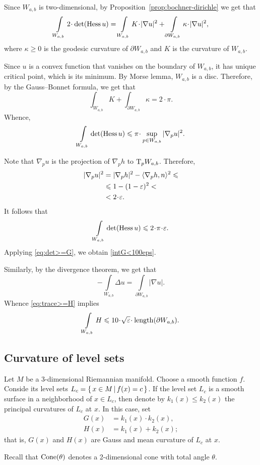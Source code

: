 Since $W_{a,b}$ is two-dimensional, by Proposition~\ref{prop:bochner-dirichle} we get that
\[\int\limits_{W_{a,b}} 
2\cdot\det(\Hess u)
=\int\limits_{W_{a,b}} 
K\cdot|\nabla u|^2
+
\int\limits_{\partial W_{a,b}}
\kappa\cdot|\nabla u|^2,\]
where $\kappa\ge 0$ is the geodesic curvature of $\partial W_{a,b}$
and $K$ is the curvature of $W_{a,b}$.

Since $u$ is a convex function that vanishes on the boundary of $W_{a,b}$,
it has unique critical point, which is its minimum.
By Morse lemma,  $W_{a,b}$ is a disc.
Therefore, by the Gauss--Bonnet formula, we get that
\[\int_{W_{a,b}} K+\int_{\partial{W_{a,b}}}\kappa=2\cdot\pi.\]
Whence,
\[\int\limits_{W_{a,b}} 
\det(\Hess u)
\le\pi\cdot\sup_{p\in{W_{a,b}}}|\nabla_p u|^2.\]

Note that $\nabla_p u$ is the projection of $\nabla_ph$ to $\mathrm{T}_pW_{a,b}$.
Therefore,
\begin{align*}
|\nabla_p u|^2&=|\nabla_p h|^2-\langle\nabla_p h,n\rangle^2\le
\\
&\le1-(1-\eps)^2<
\\
&<2\cdot\eps.
\end{align*}
It follows that 
\[\int\limits_{W_{a,b}} 
\det(\Hess u)
\le2\cdot \pi\cdot\eps.\]
Applying \ref{eq:det>=G}, we obtain \ref{intG<100eps}.

Similarly,  by the divergence theorem, we get that
\[-\int\limits_{W_{a,b}} \Delta u=\int\limits_{\partial{W_{a,b}}} |\nabla u|.\]
Whence \ref{eq:trace>=H} implies 
\[\int\limits_{W_{a,b}} H\le 10\cdot \sqrt{\eps}\cdot \length(\partial{W_{a,b}}).\]
\qeds

\subsection{Curvature of level sets}

Let $M$ be a 3-dimensional Riemannian manifold.
Choose a smooth function $f$.
Conside its level sets $L_c=\left\{\,x\in M\,\middle|\,f(x)=c\,\right\}$.
If the level set $L_c$ is a smooth surface in a neighborhood of $x\in L_c$,
then denote by $k_1(x)\le k_2(x)$ the principal curvatures of $L_c$ at $x$.
In this case, set 
\begin{align*}
G(x)&=k_1(x)\cdot k_2(x),
\\
H(x)&=k_1(x)+ k_2(x);
\end{align*}
that is, $G(x)$ and $H(x)$ are Gauss and mean curvature of $L_c$ at $x$.

Recall that $\operatorname{Cone}(\theta)$ denotes a 2-dimensional cone with total angle $\theta$.

